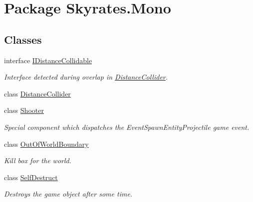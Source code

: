 \hypertarget{namespace_skyrates_1_1_mono}{\section{Package Skyrates.\-Mono}
\label{namespace_skyrates_1_1_mono}
}
\subsection*{Classes}
\begin{DoxyCompactItemize}
\item 
interface \hyperlink{interface_skyrates_1_1_mono_1_1_i_distance_collidable}{I\-Distance\-Collidable}
\begin{DoxyCompactList}\small\item\em Interface detected during overlap in \hyperlink{class_skyrates_1_1_mono_1_1_distance_collider}{Distance\-Collider}. \end{DoxyCompactList}\item 
class \hyperlink{class_skyrates_1_1_mono_1_1_distance_collider}{Distance\-Collider}
\item 
class \hyperlink{class_skyrates_1_1_mono_1_1_shooter}{Shooter}
\begin{DoxyCompactList}\small\item\em Special component which dispatches the Event\-Spawn\-Entity\-Projectile game event. \end{DoxyCompactList}\item 
class \hyperlink{class_skyrates_1_1_mono_1_1_out_of_world_boundary}{Out\-Of\-World\-Boundary}
\begin{DoxyCompactList}\small\item\em Kill box for the world. \end{DoxyCompactList}\item 
class \hyperlink{class_skyrates_1_1_mono_1_1_self_destruct}{Self\-Destruct}
\begin{DoxyCompactList}\small\item\em Destroys the game object after some time. \end{DoxyCompactList}\end{DoxyCompactItemize}
